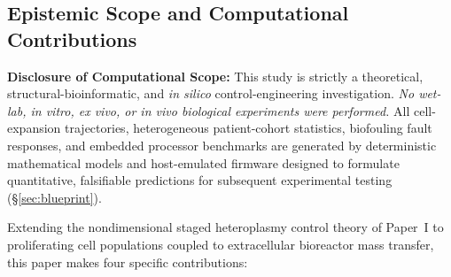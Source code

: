 \documentclass[11pt]{article}
\theoremstyle{plain}
\theoremstyle{remark}
\begin{document}
\subsection{Epistemic Scope and Computational Contributions}
\textbf{Disclosure of Computational Scope:} This study is strictly a theoretical, structural-bioinformatic, and \textit{in silico} control-engineering investigation. \emph{No wet-lab, in vitro, ex vivo, or in vivo biological experiments were performed.} All cell-expansion trajectories, heterogeneous patient-cohort statistics, biofouling fault responses, and embedded processor benchmarks are generated by deterministic mathematical models and host-emulated firmware designed to formulate quantitative, falsifiable predictions for subsequent experimental testing (\S\ref{sec:blueprint}).

Extending the nondimensional staged heteroplasmy control theory of Paper~I \cite{satz2026paper1} to proliferating cell populations coupled to extracellular bioreactor mass transfer, this paper makes four specific contributions:
\end{document}
